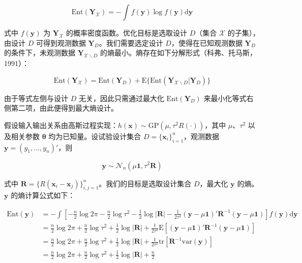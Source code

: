 \documentclass{ctexart}
\begin{document}
\begin{equation*}
\mathrm{Ent}(\boldsymbol{Y}_\mathcal{X})=-\int f(\boldsymbol{y})\log f(\boldsymbol{y})\mathrm{d}\boldsymbol{y}
\end{equation*}

式中 $f(\boldsymbol{y})$ 为 $\boldsymbol{Y}_\mathcal{X}$ 的概率密度函数。优化目标是选取设计 $D$（集合 $\mathcal{X}$ 的子集），由设计 $D$ 可得到观测数据 $\boldsymbol{Y}_D$。我们需要选定设计 $D$，使得在已知观测数据 $\boldsymbol{Y}_D$ 的条件下，未观测数据 $\boldsymbol{Y}_{\mathcal{X}\backslash D}$ 的熵最小。熵存在如下分解形式（科弗、托马斯，1991）：

\begin{equation*}
\mathrm{Ent}(\boldsymbol{Y}_\mathcal{X})=\mathrm{Ent}(\boldsymbol{Y}_D)+\mathrm{E}\{\mathrm{Ent}(\boldsymbol{Y}_{\mathcal{X}\backslash D}|\boldsymbol{Y}_D)\}
\end{equation*}

由于等式左侧与设计 $D$ 无关，因此只需通过最大化 $\mathrm{Ent}(\boldsymbol{Y}_D)$ 来最小化等式右侧第二项，由此便得到最大熵设计。

假设输入输出关系由高斯过程实现：$h(\boldsymbol{x})\sim\mathrm{GP}(\mu,\tau^2R(\cdot))$，其中 $\mu$、$\tau^2$ 以及相关参数 $\boldsymbol{\theta}$ 均为已知量。设试验设计集合 $D=\{\boldsymbol{x}_i\}_{i=1}^n$，观测数据 $\boldsymbol{y}=(y_1,\dots,y_n)'$，则

\begin{equation*}
\boldsymbol{y}\sim\mathcal{N}_n(\mu\boldsymbol{1},\tau^2\boldsymbol{R})
\end{equation*}

式中 $\boldsymbol{R}=\{R(\boldsymbol{x}_i-\boldsymbol{x}_j)\}_{i,j=1}^n$。我们的目标是选取设计集合 $D$，最大化 $\boldsymbol{y}$ 的熵。$\boldsymbol{y}$ 的熵计算公式如下：

\begin{align*}
\mathrm{Ent}(\boldsymbol{y})&=-\int\left[-\frac{n}{2}\log2\pi-\frac{n}{2}\log\tau^2-\frac{1}{2}\log|\boldsymbol{R}|-\frac{1}{2\tau^2}(\boldsymbol{y}-\mu\boldsymbol{1})'\boldsymbol{R}^{-1}(\boldsymbol{y}-\mu\boldsymbol{1})\right] f(\boldsymbol{y})\mathrm{d}\boldsymbol{y}\\
&=\frac{n}{2}\log2\pi+\frac{n}{2}\log\tau^2+\frac{1}{2}\log|\boldsymbol{R}|+\frac{1}{2\tau^2}\mathrm{E}\left[(\boldsymbol{y}-\mu\boldsymbol{1})'\boldsymbol{R}^{-1}(\boldsymbol{y}-\mu\boldsymbol{1})\right]\\
&=\frac{n}{2}\log2\pi+\frac{n}{2}\log\tau^2+\frac{1}{2}\log|\boldsymbol{R}|+\frac{1}{2\tau^2}\mathrm{tr}\left[\boldsymbol{R}^{-1}\mathrm{var}(\boldsymbol{y})\right]\\
&=\frac{n}{2}\log2\pi+\frac{n}{2}\log\tau^2+\frac{1}{2}\log|\boldsymbol{R}|+\frac{n}{2}
\end{align*}
\end{document}
